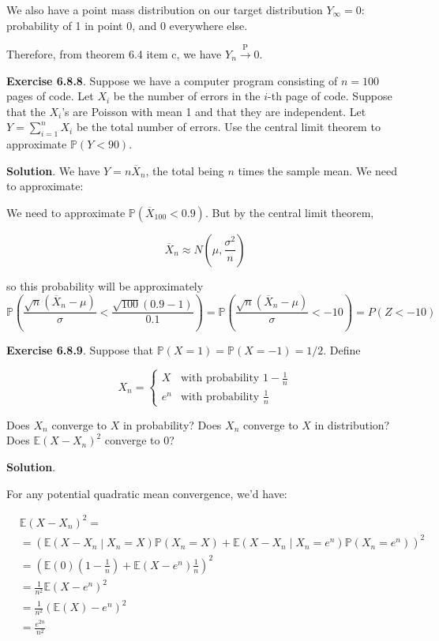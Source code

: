 We also have a point mass distribution on our target distribution
\(Y_\infty = 0\): probability of 1 in point 0, and 0 everywhere else.

Therefore, from theorem 6.4 item c, we have
\(Y_n \xrightarrow{\text{P}} 0\).

\textbf{Exercise 6.8.8}. Suppose we have a computer program consisting
of \(n = 100\) pages of code. Let \(X_i\) be the number of errors in the
\(i\)-th page of code. Suppose that the \(X_i\)'s are Poisson with mean
1 and that they are independent. Let \(Y = \sum_{i=1}^n X_i\) be the
total number of errors. Use the central limit theorem to approximate
\(\mathbb{P}(Y < 90)\).

\textbf{Solution}. We have \(Y = n \overline{X}_n\), the total being
\(n\) times the sample mean. We need to approximate:

We need to approximate \(\mathbb{P}(\overline{X}_{100} < 0.9)\). But by
the central limit theorem,

\[ \overline{X}_n \approx N\left(\mu, \frac{\sigma^2}{n}\right) \]

so this probability will be approximately \[
\mathbb{P}\left(\frac{\sqrt{n}(\overline{X}_n - \mu)}{\sigma} < \frac{\sqrt{100}(0.9 - 1)}{0.1}\right) 
= \mathbb{P}\left(\frac{\sqrt{n}(\overline{X}_n - \mu)}{\sigma} < -10 \right) 
= P(Z < -10)\]

\textbf{Exercise 6.8.9}. Suppose that
\(\mathbb{P}(X = 1) = \mathbb{P}(X = -1) = 1/2\). Define

\[
\begin{equation}
  X_n =
    \begin{cases}
      X   & \text{with probability } 1 - \frac{1}{n}\\
      e^n & \text{with probability } \frac{1}{n}
    \end{cases}       
\end{equation}
\]

Does \(X_n\) converge to \(X\) in probability? Does \(X_n\) converge to
\(X\) in distribution? Does \(\mathbb{E}(X - X_n)^2\) converge to 0?

\textbf{Solution}.

For any potential quadratic mean convergence, we'd have:

\begin{align}
&\mathbb{E}(X - X_n)^2 = \\
& = \left(\mathbb{E}(X - X_n \middle| X_n = X)\mathbb{P}(X_n = X) + \mathbb{E}(X - X_n \middle| X_n = e^n)\mathbb{P}(X_n = e^n) \right)^2 \\
& = \left(\mathbb{E}(0)\left(1 - \frac{1}{n} \right) + \mathbb{E}(X - e^n)\frac{1}{n} \right)^2 \\
& = \frac{1}{n^2} \mathbb{E}(X - e^n)^2 \\
& = \frac{1}{n^2} \left( \mathbb{E}(X) - e^n  \right)^2 \\
& = \frac{e^{2n}}{n^2}
\end{align}


